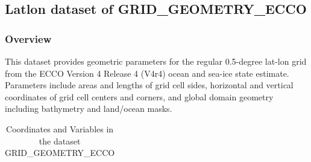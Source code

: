 \subsection{Latlon dataset of GRID\_GEOMETRY\_ECCO}
\newp
\subsubsection{Overview}
This dataset provides geometric parameters for the regular 0.5-degree lat-lon grid from the ECCO Version 4 Release 4 (V4r4) ocean and sea-ice state estimate. Parameters include areas and lengths of grid cell sides, horizontal and vertical coordinates of grid cell centers and corners, and global domain geometry including bathymetry and land/ocean masks. 
\begin{longtable}{|m{}|m{}|m{}|}
\caption{Coordinates and Variables in the dataset GRID\_GEOMETRY\_ECCO}
\label{tab:table-<xarray.Dataset> Size: 121MB
Dimensions:         (Z: 50, latitude: 360, longitude: 720, nv: 2)
Coordinates:
  * Z               (Z) float32 200B -5.0 -15.0 -25.0 ... -5.461e+03 -5.906e+03
  * latitude        (latitude) float32 1kB -89.75 -89.25 -88.75 ... 89.25 89.75
  * longitude       (longitude) float32 3kB -179.8 -179.2 -178.8 ... 179.2 179.8
    latitude_bnds   (latitude, nv) float32 3kB ...
    longitude_bnds  (longitude, nv) float32 6kB ...
    Z_bnds          (Z, nv) float32 400B ...
Dimensions without coordinates: nv
Data variables:
    hFacC           (Z, latitude, longitude) float64 104MB ...
    Depth           (latitude, longitude) float64 2MB ...
    area            (latitude, longitude) float64 2MB ...
    drF             (Z) float32 200B ...
    maskC           (Z, latitude, longitude) bool 13MB ...
Attributes: (12/57)
    acknowledgement:                 This research was carried out by the Jet...
    author:                          Ian Fenty and Ou Wang
    cdm_data_type:                   Grid
    comment:                         Fields provided on a regular lat-lon gri...
    Conventions:                     CF-1.8, ACDD-1.3
    coordinates_comment:             Note: the global 'coordinates' attribute...
    ...                              ...
    references:                      ECCO Consortium, Fukumori, I., Wang, O.,...
    source:                          The ECCO V4r4 state estimate was produce...
    standard_name_vocabulary:        NetCDF Climate and Forecast (CF) Metadat...
    summary:                         This dataset provides geometric paramete...
    title:                           ECCO Geometry Parameters for the 0.5 deg...
}
\end{longtable}
